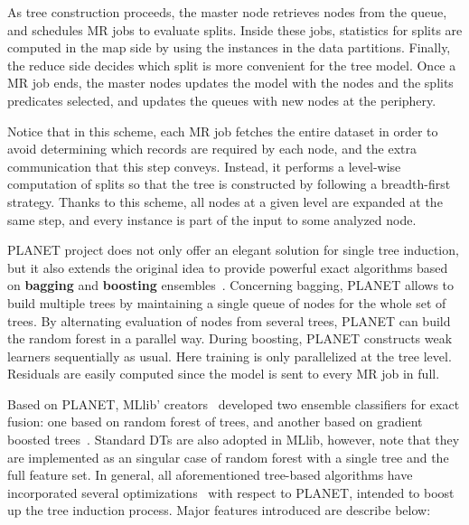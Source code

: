 \documentclass[3p,review]{elsarticle}
\begin{document}
As tree construction proceeds, the master node retrieves nodes from the queue, and schedules MR jobs to evaluate splits. Inside these jobs, statistics for splits are computed in the map side by using the instances in the data partitions. Finally, the reduce side decides which split is more convenient for the tree model. Once a MR job ends, the master nodes updates the model with the nodes and the splits predicates selected, and updates the queues with new nodes at the periphery.

Notice that in this scheme, each MR job fetches the entire dataset in order to avoid determining which records are required by each node, and the extra communication that this step conveys. Instead, it performs a level-wise computation of splits so that the tree is constructed by following a breadth-first strategy. Thanks to this scheme, all nodes at a given level are expanded at the same step, and every instance is part of the input to some analyzed node.

PLANET project does not only offer an elegant solution for single tree induction, but it also extends the original idea to provide powerful exact algorithms based on \textbf{bagging} and \textbf{boosting} ensembles~\cite{hastie11}. Concerning bagging, PLANET allows to build multiple trees by maintaining a single queue of nodes for the whole set of trees. By alternating evaluation of nodes from several trees, PLANET can build the random forest in a parallel way. During boosting, PLANET constructs weak learners sequentially as usual. Here training is only parallelized at the tree level. Residuals are easily computed since the model is sent to every MR job in full.

Based on PLANET, MLlib' creators~\cite{mllib15} developed two ensemble classifiers for exact fusion: one based on random forest of trees, and another based on gradient boosted trees~\cite{mllibtrees}. Standard DTs are also adopted in MLlib, however, note that they are implemented as an singular case of random forest with a single tree and the full feature set. In general, all aforementioned tree-based algorithms have incorporated several optimizations~\cite{mllibdt} with respect to PLANET, intended to boost up the tree induction process. Major features introduced are describe below:
\end{document}
